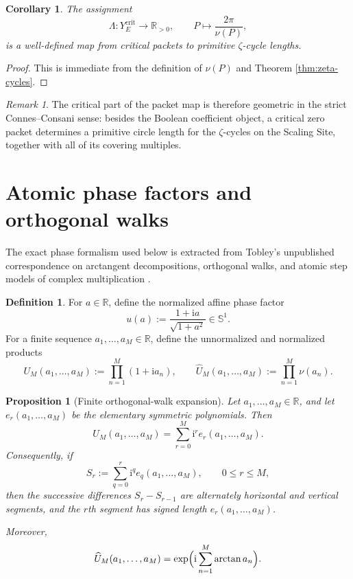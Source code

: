 \documentclass[11pt,a4paper]{article}
\numberwithin{equation}{section}
\newtheorem{proposition}[theorem]{Proposition}
\newtheorem{corollary}[theorem]{Corollary}
\theoremstyle{definition}
\newtheorem{definition}[theorem]{Definition}
\theoremstyle{remark}
\newtheorem{remark}[theorem]{Remark}
\newcommand{\RR}{\mathbb R}
\newcommand{\Sph}{\mathbb S^1}
\newcommand{\ii}{\mathrm i}
\begin{document}
\begin{corollary}\label{cor:critical-map}
The assignment
\[
\Lambda:Y_E^{\mathrm{crit}}\longrightarrow \RR_{>0},
\qquad
P\longmapsto \frac{2\pi}{\nu(P)},
\]
is a well-defined map from critical packets to primitive $\zeta$-cycle lengths.
\end{corollary}

\begin{proof}
This is immediate from the definition of $\nu(P)$ and Theorem \ref{thm:zeta-cycles}.
\end{proof}

\begin{remark}
The critical part of the packet map is therefore geometric in the strict Connes--Consani sense: besides the Boolean coefficient object, a critical zero packet determines a primitive circle length for the $\zeta$-cycles on the Scaling Site, together with all of its covering multiples.
\end{remark}

\section{Atomic phase factors and orthogonal walks}

The exact phase formalism used below is extracted from Tobley's unpublished correspondence on arctangent decompositions, orthogonal walks, and atomic step models of complex multiplication \cite{Tobley}.

\begin{definition}
For $a\in\RR$, define the normalized affine phase factor
\[
u(a):=\frac{1+\ii a}{\sqrt{1+a^2}}\in\Sph.
\]
For a finite sequence $a_1,\dots,a_M\in\RR$, define the unnormalized and normalized products
\[
U_M(a_1,\dots,a_M):=\prod_{n=1}^M (1+\ii a_n),
\qquad
\widehat U_M(a_1,\dots,a_M):=\prod_{n=1}^M \nu(a_n).
\]
\end{definition}

\begin{proposition}[Finite orthogonal-walk expansion]\label{prop:finite-orthogonal}
Let $a_1,\dots,a_M\in\RR$, and let $e_r(a_1,\dots,a_M)$ be the elementary symmetric polynomials.  Then
\[
U_M(a_1,\dots,a_M)=\sum_{r=0}^M \ii^r e_r(a_1,\dots,a_M).
\]
Consequently, if
\[
S_r:=\sum_{q=0}^r \ii^q e_q(a_1,\dots,a_M),
\qquad 0\le r\le M,
\]
then the successive differences $S_r-S_{r-1}$ are alternately horizontal and vertical segments, and the $r$th segment has signed length $e_r(a_1,\dots,a_M)$.

Moreover,
\[
\widehat U_M(a_1,\dots,a_M)=\exp\Bigl(\ii\sum_{n=1}^M \arctan a_n\Bigr).
\]
\end{proposition}
\end{document}
